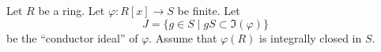 \begin{situation}
\label{situation-one-transcendental-element}
Let $R$ be a ring.
Let $\varphi : R[x] \to S$ be finite.
Let
$$
J = \{ g \in S \mid gS \subset \Im(\varphi)\}
$$
be the ``conductor ideal'' of $\varphi$.
Assume that $\varphi(R)$ is integrally closed in $S$.
\end{situation}
